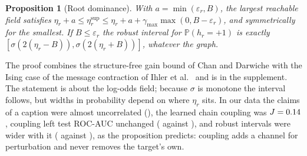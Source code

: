 \documentclass[journal]{IEEEtran}
\newtheorem{proposition}{Proposition}
\theoremstyle{remark}\newtheorem{remark}{Remark}
\renewcommand{\Pr}{\mathbb{P}}
\begin{document}
\begin{proposition}[Root dominance]\label{prop:ising}
With $a=\min(\varepsilon_r,B)$, the largest reachable field satisfies $\eta_r+a\le\eta_r^{\sup}\le\eta_r+a+\gamma_{\max}\max(0,B-\varepsilon_r)$, and symmetrically for the smallest. If $B\le\varepsilon_r$ the robust interval for $\Pr(h_r=+1)$ is exactly $[\sigma(2(\eta_r-B)),\sigma(2(\eta_r+B))]$, whatever the graph.
\end{proposition}
The proof combines the structure-free gain bound of Chan and Darwiche \cite{chan2002numbers} with the Ising case of the message contraction of Ihler et al.\ \cite{ihler2005loopy} and is in the supplement. The statement is about the log-odds field; because $\sigma$ is monotone the interval follows, but widths in probability depend on where $\eta_r$ sits. In our data the claims of a caption were almost uncorrelated (\CorrTest), the learned chain coupling was $J=0.14$, coupling left test ROC-AUC unchanged (\AucIsing{} against \AucUnary), and robust intervals were wider with it (\WidthJ{} against \WidthJzero), as the proposition predicts: coupling adds a channel for perturbation and never removes the target's own.



\end{document}
